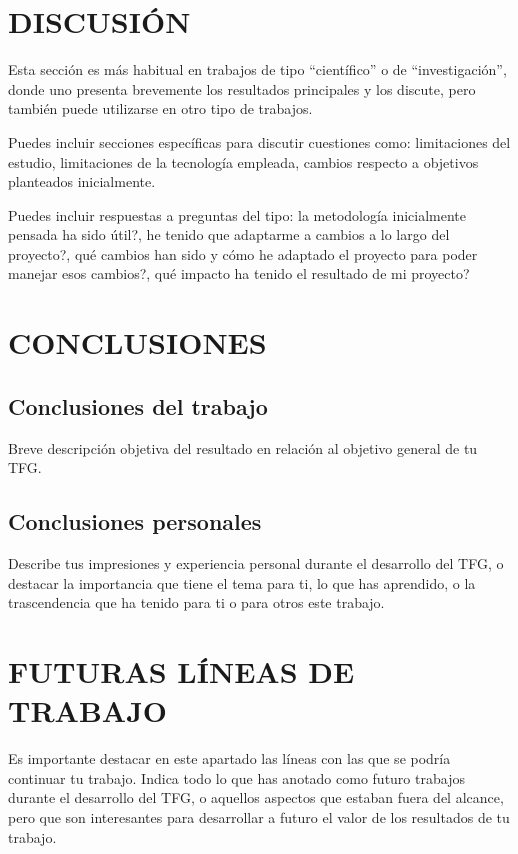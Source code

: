 \documentclass[11pt,a4paper]{report}
\begin{document}
\chapter{DISCUSI\'ON}

Esta secci\'on es m\'as habitual en trabajos de tipo ``cient\'ifico'' o de ``investigaci\'on'', donde uno presenta brevemente los resultados principales y los discute, pero tambi\'en puede utilizarse en otro tipo de trabajos.

Puedes incluir secciones espec\'ificas para discutir cuestiones como: limitaciones del estudio, limitaciones de la tecnolog\'ia empleada, cambios respecto a objetivos planteados inicialmente.

Puedes incluir respuestas a preguntas del tipo: \textquestiondown la metodolog\'ia inicialmente pensada ha sido \'util?, \textquestiondown he tenido que adaptarme a cambios a lo largo del proyecto?, \textquestiondown qu\'e cambios han sido y c\'omo he adaptado el proyecto para poder manejar esos cambios?, \textquestiondown qu\'e impacto ha tenido el resultado de mi proyecto?

\chapter{CONCLUSIONES}
\section{Conclusiones del trabajo}
Breve descripci\'on objetiva del resultado en relaci\'on al objetivo general de tu TFG.

\section{Conclusiones personales}
Describe tus impresiones y experiencia personal durante el desarrollo del TFG, o destacar la importancia que tiene el tema para ti, lo que has aprendido, o la trascendencia que ha tenido para ti o para otros este trabajo.

\chapter{FUTURAS L\'INEAS DE TRABAJO}
Es importante destacar en este apartado las l\'ineas con las que se podr\'ia continuar tu trabajo. Indica todo lo que has anotado como futuro trabajos durante el desarrollo del TFG, o aquellos aspectos que estaban fuera del alcance, pero que son interesantes para desarrollar a futuro el valor de los resultados de tu trabajo.
\end{document}
